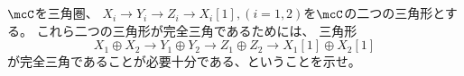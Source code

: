 \documentclass[uplatex,dvipdfmx]{jsarticle}
\begin{document}
\maketitle
\HeaderCommentA
\section{}
\fi



\begin{prob}\label{1.13}
  \(\mcC\)を三角圏、
  \(X_i\to Y_i\to Z_i\to X_i[1], (i=1,2)\)を\(\mcC\)の二つの三角形とする。
  これら二つの三角形が完全三角であるためには、
  三角形
  \[X_1\oplus X_2 \to Y_1\oplus Y_2 \to Z_1\oplus Z_2 \to X_1[1]\oplus X_2[1]\]
  が完全三角であることが必要十分である、ということを示せ。
\end{prob}
\end{document}
